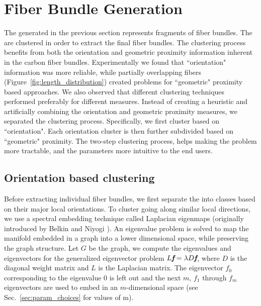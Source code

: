 \section{Fiber Bundle Generation}
\label{subsec:fiber-bundles}
The \mt generated in the previous section represents fragments of fiber bundles. The \mt are clustered in order to extract the final fiber bundles. The clustering process benefits from both the orientation and geometric proximity information inherent in the carbon fiber bundles. Experimentally we found that ``orientation" information was more reliable, while partially overlapping fibers (Figure~\ref{fig:length_distribution}) created problems for ``geometric" proximity based approaches. We also observed that different clustering techniques performed preferably for different measures. 
Instead of creating a heuristic and artificially combining the orientation and geometric proximity measures, we separated the clustering process. 
Specifically, we first cluster based on ``orientation". Each orientation cluster is then further subdivided based on ``geometric" proximity.
The two-step clustering process, helps making the problem more tractable, and the parameters more intuitive to the end users. 
\subsection{Orientation based clustering}
\label {subsec:orientation_clustering}
Before extracting individual fiber bundles, we first separate the \mt into classes based on their major local orientations. To cluster \mt going along similar local directions, we use a spectral embedding technique called Laplacian eigenmaps (originally introduced by Belkin and Niyogi \cite{Belkin01}). An eigenvalue problem is solved to map the manifold embedded in a graph into a lower dimensional space, while preserving the graph structure. 
Let $G$ be the graph, we compute the eigenvalues and eigenvectors for the generalized eigenvector problem $L\textit{\textbf{f}}=\lambda D\textit{\textbf{f}}$,
where $D$ is the diagonal weight matrix and $L$ is the Laplacian matrix. The eigenvector \textbf{${f}_{0}$} corresponding to the eigenvalue 0 is left out and the next $m$, {\textbf{${f}_{1}$} through \textbf{${f}_{m}$}} eigenvectors are used to embed in an $m$-dimensional space (see Sec.~\ref{sec:param_choices} for values of m). 

